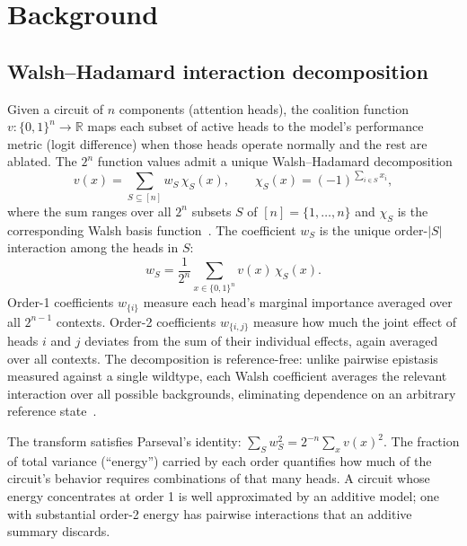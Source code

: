 %

\section{Background}
\label{sec:background}

\subsection{Walsh--Hadamard interaction decomposition}
\label{sec:walsh-decomposition}

Given a circuit of $n$ components (attention heads), the coalition
function $v: \{0,1\}^n \to \mathbb{R}$ maps each subset of active heads
to the model's performance metric (logit difference) when those heads
operate normally and the rest are ablated. The $2^n$ function values
admit a unique Walsh--Hadamard decomposition
\begin{equation}
  v(x) = \sum_{S \subseteq [n]} w_S \,\chi_S(x),
  \qquad
  \chi_S(x) = (-1)^{\sum_{i \in S} x_i},
\end{equation}
where the sum ranges over all $2^n$ subsets $S$ of $[n] = \{1, \ldots, n\}$
and $\chi_S$ is the corresponding Walsh basis
function~\citep{poelwijk2016context}. The coefficient $w_S$ is the
unique order-$|S|$ interaction among the heads in $S$:
\begin{equation}
  w_S = \frac{1}{2^n} \sum_{x \in \{0,1\}^n} v(x)\,\chi_S(x).
  \label{eq:walsh-coeff}
\end{equation}
Order-1 coefficients $w_{\{i\}}$ measure each head's marginal
importance averaged over all $2^{n-1}$ contexts. Order-2 coefficients
$w_{\{i,j\}}$ measure how much the joint effect of heads $i$ and $j$
deviates from the sum of their individual effects, again averaged over
all contexts. The decomposition is reference-free: unlike pairwise
epistasis measured against a single wildtype, each Walsh coefficient
averages the relevant interaction over all possible backgrounds,
eliminating dependence on an arbitrary reference
state~\citep{poelwijk2019learning}.

The transform satisfies Parseval's identity: $\sum_S w_S^2 = 2^{-n}
\sum_x v(x)^2$. The fraction of total variance (``energy'') carried by
each order quantifies how much of the circuit's behavior requires
combinations of that many heads. A circuit whose energy concentrates at
order 1 is well approximated by an additive model; one with substantial
order-2 energy has pairwise interactions that an additive summary
discards.

